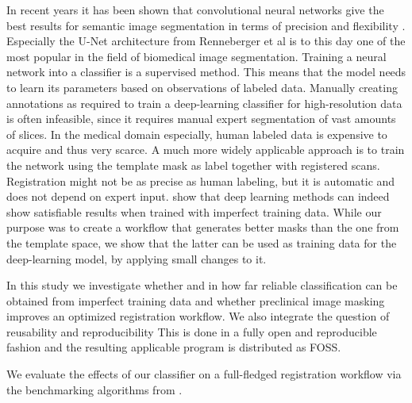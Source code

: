 In recent years it has been shown that convolutional neural networks give the best results for semantic image segmentation in terms of precision and flexibility \cite{geng_survey_2018}.
Especially the U-Net architecture from Renneberger et al \cite{ronneberger_u-net:_2015} is to this day one of the most popular in the field of biomedical image segmentation.
Training a neural network into a classifier is a supervised method.
This means that the model needs to learn its parameters based on observations of labeled data.
Manually creating annotations as required to train a deep-learning classifier for high-resolution data is often infeasible, since it requires manual expert segmentation of vast amounts of slices.
In the medical domain especially, human labeled data is expensive to acquire and thus very scarce.
A much more widely applicable approach is to train the network using the template mask as label together with registered scans.
Registration might not be as precise as human labeling, but it is automatic and does not depend on expert input.
\cite{imperfect_datasets, imperferct_segmentaion_labels} show that deep learning methods can indeed show satisfiable results when trained with imperfect training data.
While our purpose was to create a workflow that generates better masks than the one from the template space, we show that the latter can be used as training data for the deep-learning model, by applying small changes to it.


In this study we investigate whether and in how far reliable classification can be obtained from imperfect training data and whether preclinical image masking improves an optimized registration workflow.
We also integrate the question of reusability and reproducibility 
This is done in a fully open and reproducible fashion and the resulting applicable program is distributed as FOSS.


We evaluate the effects of our classifier on a full-fledged registration workflow via the benchmarking algorithms from \cite{ioanas_optimized_2019}.


